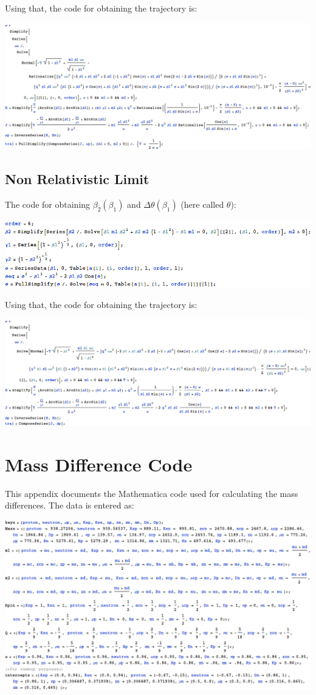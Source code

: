 \documentclass[11pt,a4paper]{article}
\begin{document}
Using that, the code for obtaining the trajectory is:

\includegraphics[width=\linewidth]{figures/AnalyticRelativisticRegge}

\subsection{Non Relativistic Limit}
The code for obtaining $\beta_2\left(\beta_1\right)$ and $\Delta\theta\left(\beta_1\right)$ (here called $\theta$):

\includegraphics[width=\linewidth]{figures/AnalyticNonRelativisticKin}

Using that, the code for obtaining the trajectory is:

\includegraphics[width=\linewidth]{figures/AnalyticNonRelativisticRegge}
\FloatBarrier
\section{Mass Difference Code}
This appendix documents the Mathematica code used for calculating the mass differences. The data is entered as:

\includegraphics[width=\linewidth]{figures/MassDifferencesData}
\end{document}

